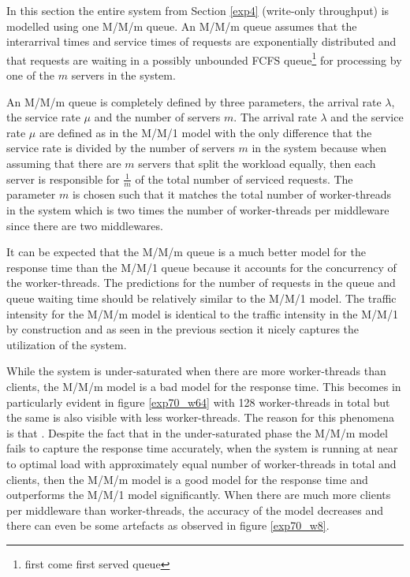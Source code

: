 \documentclass[report.tex]{subfiles}
\begin{document}
In this section the entire system from Section \ref{exp4} (write-only throughput) is modelled using one M/M/m queue. An M/M/m queue assumes that the interarrival times and service times of requests are exponentially distributed and that requests are waiting in a possibly unbounded FCFS queue\footnote{first come first served queue} for processing by one of the $m$ servers in the system.

An M/M/m queue is completely defined by three parameters, the arrival rate $\lambda$, the service rate $\mu$ and the number of servers $m$.
The arrival rate $\lambda$ and the service rate $\mu$ are defined as in the M/M/1 model with the only difference that the service rate is divided by the number of servers $m$ in the system because when assuming that there are $m$ servers that split the workload equally, then each server is responsible for $\frac{1}{m}$ of the total number of serviced requests. The parameter $m$ is chosen such that it matches the total number of worker-threads in the system which is two times the number of worker-threads per middleware since there are two middlewares.

It can be expected that the M/M/m queue is a much better model for the response time than the M/M/1 queue because it accounts for the concurrency of the worker-threads. The predictions for the number of requests in the queue and queue waiting time should be relatively similar to the M/M/1 model. The traffic intensity for the M/M/m model is identical to the traffic intensity in the M/M/1 by construction and as seen in the previous section it nicely captures the utilization of the system.

While the system is under-saturated when there are more worker-threads than clients, the M/M/m model is a bad model for the response time. This becomes in particularly evident in figure \ref{exp70_w64} with 128 worker-threads in total but the same is also visible with less worker-threads. The reason for this phenomena is that .
Despite the fact that in the under-saturated phase the M/M/m model fails to capture the response time accurately, when the system is running at near to optimal load with approximately equal number of worker-threads in total and clients, then the M/M/m model is a good model for the response time and outperforms the M/M/1 model significantly.
When there are much more clients per middleware than worker-threads, the accuracy of the model decreases and there can even be some artefacts as observed in figure  \ref{exp70_w8}.
\end{document}
